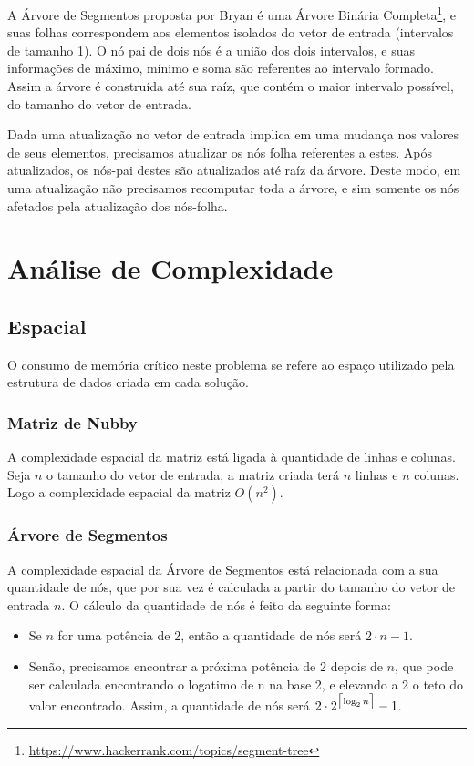 \documentclass{article}
\DeclarePairedDelimiter{\ceil}{\lceil}{\rceil}
\begin{document}
A Árvore de Segmentos proposta por Bryan é uma Árvore Binária Completa\footnote{\url{https://www.hackerrank.com/topics/segment-tree}}, e suas folhas correspondem aos elementos isolados do vetor de entrada (intervalos de tamanho 1). O nó pai de dois nós é a união dos dois intervalos, e suas informações de máximo, mínimo e soma são referentes ao intervalo formado. Assim a árvore é construída até sua raíz, que contém o maior intervalo possível, do tamanho do vetor de entrada.

Dada uma atualização no vetor de entrada implica em uma mudança nos valores de seus elementos, precisamos atualizar os nós folha referentes a estes. Após atualizados, os nós-pai destes são atualizados até raíz da árvore. Deste modo, em uma atualização não precisamos recomputar toda a árvore, e sim somente os nós afetados pela atualização dos nós-folha.

\section{Análise de Complexidade}

\subsection{Espacial}

O consumo de memória crítico neste problema se refere ao espaço utilizado pela estrutura de dados criada em cada solução.

\subsubsection{Matriz de Nubby}

A complexidade espacial da matriz está ligada à quantidade de linhas e colunas. Seja $n$ o tamanho do vetor de entrada, a matriz criada terá $n$ linhas e $n$ colunas. Logo a complexidade espacial da matriz $O(n^2)$.

\subsubsection{Árvore de Segmentos}

A complexidade espacial da Árvore de Segmentos está relacionada com a sua quantidade de nós, que por sua vez é calculada a partir do tamanho do vetor de entrada $n$. O cálculo da quantidade de nós é feito da seguinte forma:

\begin{itemize}
\item Se $n$ for uma potência de 2, então a quantidade de nós será $2 \cdot n - 1$.
\item Senão, precisamos encontrar a próxima potência de 2 depois de $n$, que pode ser calculada encontrando o logatimo de n na base 2, e elevando a 2 o teto do valor encontrado. Assim, a quantidade de nós será $2 \cdot 2^{\ceil[\big]{\log_2 n}} - 1$.
\end{itemize}
\end{document}
